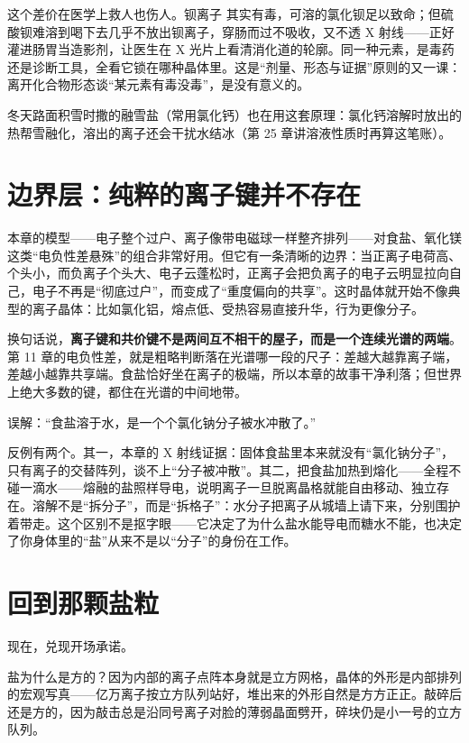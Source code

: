 这个差价在医学上救人也伤人。钡离子  其实有毒，可溶的氯化钡足以致命；但硫酸钡难溶到喝下去几乎不放出钡离子，穿肠而过不吸收，又不透 X 射线——正好灌进肠胃当造影剂，让医生在 X 光片上看清消化道的轮廓。同一种元素，是毒药还是诊断工具，全看它锁在哪种晶体里。这是“剂量、形态与证据”原则的又一课：离开化合物形态谈“某元素有毒没毒”，是没有意义的。

冬天路面积雪时撒的融雪盐（常用氯化钙）也在用这套原理：氯化钙溶解时放出的热帮雪融化，溶出的离子还会干扰水结冰（第 25 章讲溶液性质时再算这笔账）。

\section{边界层：纯粹的离子键并不存在}

本章的模型——电子整个过户、离子像带电磁球一样整齐排列——对食盐、氧化镁这类“电负性差悬殊”的组合非常好用。但它有一条清晰的边界：当正离子电荷高、个头小，而负离子个头大、电子云蓬松时，正离子会把负离子的电子云明显拉向自己，电子不再是“彻底过户”，而变成了“重度偏向的共享”。这时晶体就开始不像典型的离子晶体：比如氯化铝，熔点低、受热容易直接升华，行为更像分子。

换句话说，\textbf{离子键和共价键不是两间互不相干的屋子，而是一个连续光谱的两端}。第 11 章的电负性差，就是粗略判断落在光谱哪一段的尺子：差越大越靠离子端，差越小越靠共享端。食盐恰好坐在离子的极端，所以本章的故事干净利落；但世界上绝大多数的键，都住在光谱的中间地带。

\begin{wuqu}
误解：“食盐溶于水，是一个个氯化钠分子被水冲散了。”

反例有两个。其一，本章的 X 射线证据：固体食盐里本来就没有“氯化钠分子”，只有离子的交替阵列，谈不上“分子被冲散”。其二，把食盐加热到熔化——全程不碰一滴水——熔融的盐照样导电，说明离子一旦脱离晶格就能自由移动、独立存在。溶解不是“拆分子”，而是“拆格子”：水分子把离子从城墙上请下来，分别围护着带走。这个区别不是抠字眼——它决定了为什么盐水能导电而糖水不能，也决定了你身体里的“盐”从来不是以“分子”的身份在工作。
\end{wuqu}

\section{回到那颗盐粒}

现在，兑现开场承诺。

盐为什么是方的？因为内部的离子点阵本身就是立方网格，晶体的外形是内部排列的宏观写真——亿万离子按立方队列站好，堆出来的外形自然是方方正正。敲碎后还是方的，因为敲击总是沿同号离子对脸的薄弱晶面劈开，碎块仍是小一号的立方队列。

